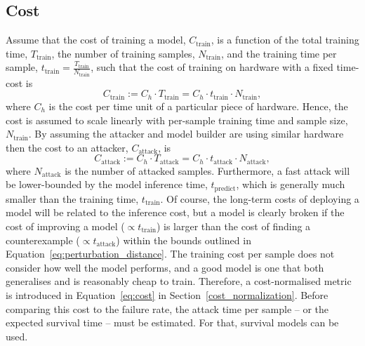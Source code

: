 \subsection{Cost}
\label{cost}

Assume that the cost of training a model, $C_{\mathrm{train}}$, is a function of the total training time, $T_{\mathrm{train}}$, the number of training samples, $N_{\mathrm{train}}$, and the training time per sample, $t_{\mathrm{train}} = \frac{T_{\mathrm{train}}}{N_{\mathrm{train}}}$, such that the cost of training on hardware with a fixed time-cost is
\begin{equation}
    C_{\mathrm{train}} := C_{h} \cdot T_{\mathrm{train}} = C_h \cdot t_{\mathrm{train}} \cdot N_{\mathrm{train}},
    \label{eq:naive_cost}
\end{equation}
where $C_h$ is the cost per time unit of a particular piece of hardware. Hence, the cost is assumed to scale linearly with per-sample training time and sample size, $N_{\mathrm{train}}$. By assuming the attacker and model builder are using similar hardware then the cost to an attacker, $C_{\mathrm{attack}}$, is
$$
    C_{\mathrm{attack}} := C_{h} \cdot T_{\mathrm{attack}} = C_h \cdot t_{\mathrm{attack}} \cdot N_{\mathrm{attack}},
$$
where $ N_{\mathrm{attack}} $ is the number of attacked samples. Furthermore, a fast attack will be lower-bounded by the model inference time, $ t_{\mathrm{predict}} $, which is generally much smaller than the training time, $ t_{\mathrm{train}} $. Of course, the long-term costs of deploying a model will be related to the inference cost, but a model is clearly broken if the cost of improving a model ($\propto t_{\mathrm{train}}$) is larger than the cost of finding a counterexample ($\propto t_{\mathrm{attack}}$) within the bounds outlined in Equation~\ref{eq:perturbation_distance}. The training cost per sample does not consider how well the model performs, and a good model is one that both generalises and is reasonably cheap to train.
Therefore, a cost-normalised metric is introduced in Equation~\ref{eq:cost} in Section~\ref{cost_normalization}. Before comparing this cost to the failure rate, the attack time per sample -- or the expected survival time --  must be estimated. For that, survival models can be used.
